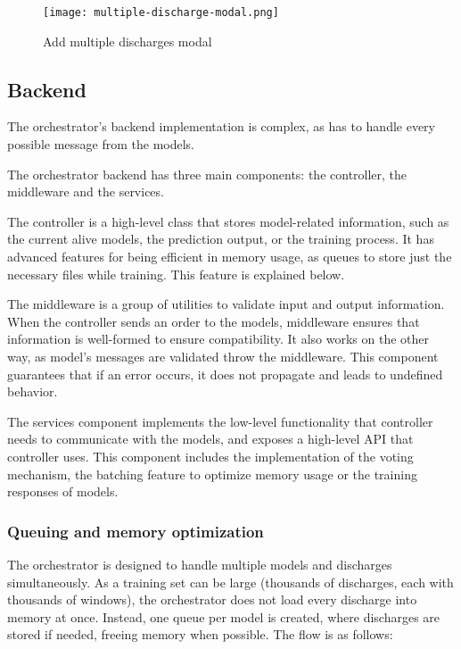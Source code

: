 \begin{figure}[H]
    \centering
    \texttt{[image: multiple-discharge-modal.png]}
    \caption{Add multiple discharges modal}
    \label{fig:frontend-add-multiple-discharge}
\end{figure}

\subsection{Backend}

The orchestrator's backend implementation is complex, as has to handle every possible message from the models. 

The orchestrator backend has three main components: the controller, the middleware and the services. 

The controller is a high-level class that stores model-related information, such as the current alive models, the prediction output, or the training process. It has advanced features for being efficient in memory usage, as queues to store just the necessary files while training. This feature is explained below.

The middleware is a group of utilities to validate input and output information. When the controller sends an order to the models, middleware ensures that information is well-formed to ensure compatibility. It also works on the other way, as model's messages are validated throw the middleware. This component guarantees that if an error occurs, it does not propagate and leads to undefined behavior.

The services component implements the low-level functionality that controller needs to communicate with the models, and exposes a high-level API that controller uses. This component includes the implementation of the voting mechanism, the batching feature to optimize memory usage or the training responses of models.

\subsubsection{Queuing and memory optimization}

The orchestrator is designed to handle multiple models and discharges simultaneously. As a training set can be large (thousands of discharges, each with thousands of windows), the orchestrator does not load every discharge into memory at once. Instead, one queue per model is created, where discharges are stored if needed, freeing memory when possible. The flow is as follows:


